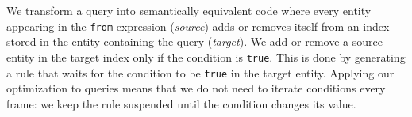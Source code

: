 We transform a query into semantically equivalent code where every entity appearing in the \texttt{from} expression (\textit{source}) adds or removes itself from an index stored in the entity containing the query (\textit{target}). We add or remove a source entity in the target index only if the condition is \texttt{true}. This is done by generating a rule that waits for the condition to be \texttt{true} in the target entity. Applying our optimization to queries means that we do not need to iterate conditions every frame: we keep the rule suspended until the condition changes its value.

